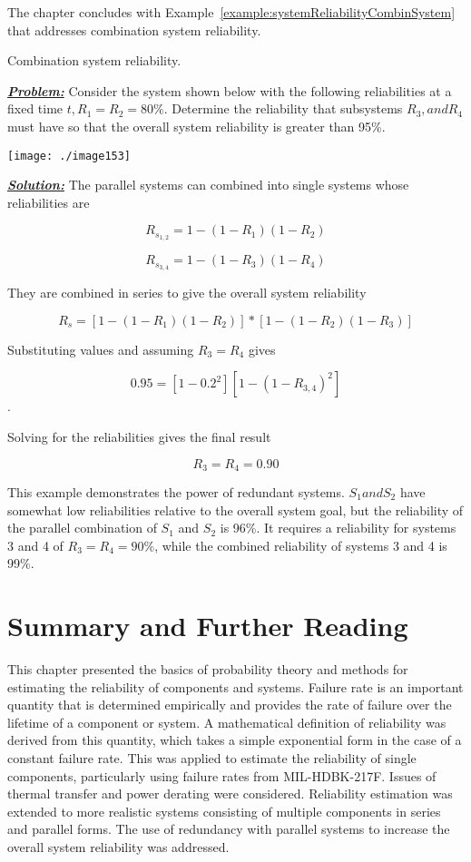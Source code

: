 {The chapter concludes with 
Example~\ref{example:systemReliabilityCombinSystem} that 
addresses combination system reliability.


\begin{example}{Combination system reliability.}
\label{example:systemReliabilityCombinSystem}

\emph{\textbf{\ul{Problem:}}} Consider the system shown below with the
following reliabilities at a fixed time $t, R_1=R_2= 80\%$. 
Determine the reliability that subsystems $R_3, and R_4$
must have so that the overall system reliability is greater than 95\%.

\texttt{[image: ./image153]}

\emph{\textbf{\ul{Solution:}}} The parallel systems can combined into
single systems whose reliabilities are

$$R_{s_{1,2}} = 1 - (1-R_1)(1-R_2) $$

$$R_{s_{3,4}} = 1 - (1-R_3)(1-R_4)$$

They are combined in series to give the overall system reliability

$$R_s = \left[ 1 - (1-R_1)(1-R_2) \right] * \left[ 1 - (1-R_2)(1-R_3) \right]$$

Substituting values and assuming $R_3 = R_4$ gives

$$0.95 = \left[ 1-0.2^2 \right] \left[1 - (1-R_{3,4})^2 \right]$$.

Solving for the reliabilities gives the final result

$$R_3 = R_4 = 0.90$$
\end{example}

This example demonstrates the power of redundant systems.
$S_1 and S_2$ have somewhat low reliabilities
relative to the overall system goal, but the reliability of the parallel
combination of $S_1$ and $S_2$ is 96\%. It requires a
reliability for systems 3 and 4 of $R_3 = R_4 = 90\%$, while the combined
reliability of systems 3 and 4 is 99\%.

\section{Summary and Further Reading}
\label{section:summary-and-further-reading}

This chapter presented the basics of probability theory and methods for
estimating the reliability of components and systems. Failure rate is an
important quantity that is determined empirically and provides the rate
of failure over the lifetime of a component or system. A mathematical
definition of reliability was derived from this quantity, which takes a
simple exponential form in the case of a constant failure rate. This was
applied to estimate the reliability of single components, particularly
using failure rates from MIL-HDBK-217F. Issues of thermal transfer and
power derating were considered. Reliability estimation was extended to
more realistic systems consisting of multiple components in series and
parallel forms. The use of redundancy with parallel systems to increase
the overall system reliability was addressed.

}

